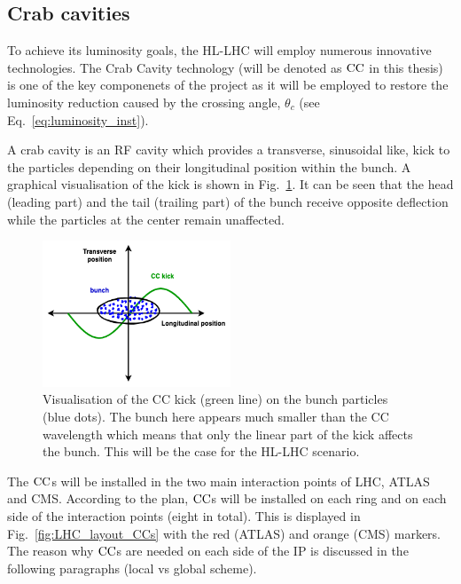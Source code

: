 

\subsection{Crab cavities}\label{subsec:CC_intro}
To achieve its luminosity goals, the HL-LHC will employ numerous innovative technologies. The Crab Cavity technology (will be denoted as ${\mathrm{CC}}$ in this thesis)~\cite{Calaga:2673544} is one of the key componenets of the project as it will be employed to restore the luminosity reduction caused by the crossing angle, $\theta_c$ (see Eq.~\eqref{eq:luminosity_inst}).

A crab cavity is an RF cavity which provides a transverse, sinusoidal like, kick to the particles depending on their longitudinal position within the bunch. A graphical visualisation of the kick is shown in Fig.~\ref{fig:cc_simple_kick}. It can be seen that the head (leading part) and the tail (trailing part) of the bunch receive opposite deflection while the particles at the center remain unaffected.

\begin{figure}[!h] %
    \centering         
    \includegraphics[width=0.5\textwidth]{images/introduction/sin_CC_kick_LHC_beams.drawio.png}
        \caption{Visualisation of the CC kick (green line) on the bunch particles (blue dots). The bunch here appears much smaller than the CC wavelength which means that only the linear part of the kick affects the bunch. This will be the case for the HL-LHC scenario.}
        \label{fig:cc_simple_kick}
 \end{figure}

The ${\mathrm{CC}}$s will be installed in the two main interaction points of LHC, ATLAS and CMS. According to the plan, ${\mathrm{CC}}$s will be installed on each ring and on each side of the interaction points (eight in total). This is displayed in Fig.~\ref{fig:LHC_layout_CCs} with the red (ATLAS) and orange (CMS) markers. The reason why ${\mathrm{CC}}$s are needed on each side of the IP is discussed in the following paragraphs (local vs global scheme).

